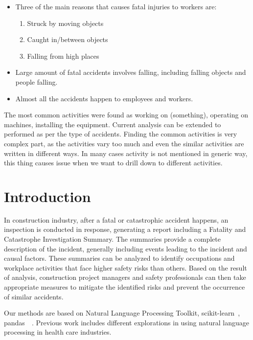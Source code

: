 \documentclass[DIV=calc, paper=a4, fontsize=11pt, twocolumn]{scrartcl}	 %
\begin{document}
\begin{itemize}
\item Three of the main reasons that causes fatal injuries to workers
  are:
  \begin{enumerate}
  \item Struck by moving objects
 \item Caught in/between objects
\item Falling from high places
  \end{enumerate}

\item Large amount of fatal accidents involves falling, including
  falling objects and people falling.

\item Almost all the accidents happen to employees and workers.

\end{itemize}

The most common activities were found as working on (something), operating on machines,
installing the equipment.
Current analysis can be extended to performed as per the type of accidents.
Finding the common activities is very complex part, as the activities vary too much and even the
similar activities are written in different ways.
In many cases activity is not mentioned in generic way, this thing causes issue when we want to
drill down to different activities.
\section*{Introduction}
In construction industry, after a fatal or catastrophic accident
happens, an inspection is conducted in response, generating a report
including a Fatality and Catastrophe Investigation Summary. The
summaries provide a complete description of the incident, generally
including events leading to the incident and causal factors. These
summaries can be analyzed to identify occupations and workplace
activities that face higher safety risks than others. Based on the
result of analysis, construction project managers and safety
professionals can then take appropriate measures to mitigate the
identified risks and prevent the occurrence of similar accidents.

Our methods are based on Natural Language Processing Toolkit,
scikit-learn~\cite{scikit-learn},
pandas~\cite{mpandas}~\cite{pandas2010}. Previous work includes
different explorations in using natural language processing in health
care industries.
\end{document}
